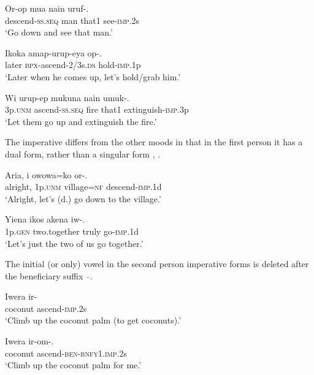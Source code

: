 \ea%
\label{ex:3:x229}
\gll Or-op mua nain uruf-. \\
descend-\textsc{ss}.\textsc{seq} man that1 see-\textsc{imp}.2s \\
\glt`Go down and see that man.'
\z

\ea%
\label{ex:3:x1847}
\gll Ikoka amap-urup-eya op-. \\
later \textsc{bpx}-ascend-2/3s.\textsc{ds} hold-\textsc{imp}.1p\\
\glt`Later when he comes up, let's hold/grab him.'
\z

\ea%
\label{ex:3:x230}
\gll Wi urup-ep mukuna nain umuk-. \\
3p.\textsc{unm} ascend-\textsc{ss}.\textsc{seq} fire that1 extinguish-\textsc{imp}.3p\\
\glt`Let them go up and extinguish the fire.' 
\z

The imperative differs from the other moods in that in the first person it has a dual form, rather than a singular form , . 

\ea%
\label{ex:3:x446}
\gll Aria, i owowa=ko or-. \\
alright, 1p.\textsc{unm} village=\textsc{nf} descend-\textsc{imp}.1d\\
\glt`Alright, let's (d.) go down to the village.'
\z

\ea%
\label{ex:3:x1196}
\gll Yiena ikos akena iw-. \\
1p.\textsc{gen} two.together truly go-\textsc{imp}.1d\\
\glt`Let's just the two of us go together.'
\z

The initial (or only) vowel in the second person imperative forms is deleted after the beneficiary suffix --. 

\ea%
\label{ex:3:x432}
\gll Iwera ir- \\
coconut ascend-\textsc{imp}.2s\\
\glt`Climb up the coconut palm (to get coconuts).'
\z

\ea%
\label{ex:3:x431}
\gll Iwera ir-om-. \\
coconut ascend-\textsc{ben}-\textsc{bnfy}1.\textsc{imp}.2s\\
\glt`Climb up the coconut palm for me.'
\z

